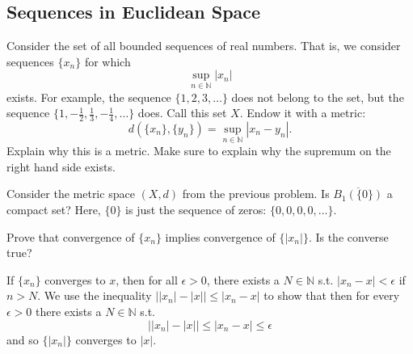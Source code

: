 \subsection{Sequences in Euclidean Space}

  \begin{exercise}
    Consider the set of all bounded sequences of real numbers. That is, we
    consider sequences $\{x_n\}$ for which
    \begin{equation}
      \sup_{n\in\mathbb{N}} |x_n|
    \end{equation}
    exists. For example, the sequence $\{1,2,3,\ldots\}$ does not belong to the set,
    but the sequence $\{1,-\frac{1}{2},\frac{1}{3},-\frac{1}{4},\ldots\}$ does. Call this set $X$. Endow it with
    a metric:
    \begin{equation}
      d(\{x_n\},\{y_n\}) = \sup_{n\in\mathbb{N}} |x_n - y_n|.
    \end{equation}
    Explain why this is a metric. Make sure to explain why the supremum on
    the right hand side exists.
  \end{exercise}
  \begin{solution}
    
  \end{solution}

  \begin{exercise}
    Consider the metric space $(X,d)$ from the previous problem. Is $\overline{B_1(\{0\})}$
    a compact set? Here, $\{0\}$ is just the sequence of zeros: $\{0,0,0,0,\ldots\}$.
  \end{exercise}
  \begin{solution}
    
  \end{solution}
  
  \begin{exercise}[Rudin 3.1]
    Prove that convergence of $\{x_n\}$ implies convergence of $\{|x_n|\}$. Is the converse true? 
  \end{exercise}
  \begin{solution}
    If $\{x_n\}$ converges to $x$, then for all $\epsilon > 0$, there exists a $N \in \mathbb{N}$ s.t. $|x_n - x| < \epsilon$ if $n > N$. We use the inequality $\big| |x_n| - |x| \big| \leq |x_n - x|$ to show that then for every $\epsilon > 0$ there exists a $N \in \mathbb{N}$ s.t. 
    \[ \big| |x_n| - |x| \big| \leq |x_n - x| \leq \epsilon \]
    and so $\{|x_n|\}$ converges to $|x|$. 
  \end{solution}


